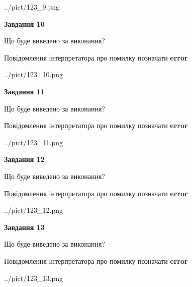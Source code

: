 \documentclass[11pt, ukrainian]{article}
\begin{document}
{\begin {large}
\begin{center}
	{../pict/123_9.png}
\end{center}
\newpage

{\begin {center}\textbf{Завдання 10}\end {center}}\par
Що буде виведено за виконання? \par
Повідомлення інтерпретатора про помилку позначати \textbf{error}

\begin{center}
	{../pict/123_10.png}
\end{center}
\newpage

{\begin {center}\textbf{Завдання 11}\end {center}}\par
Що буде виведено за виконання? \par
Повідомлення інтерпретатора про помилку позначати \textbf{error}

\begin{center}
	{../pict/123_11.png}
\end{center}
\newpage

{\begin {center}\textbf{Завдання 12}\end {center}}\par
Що буде виведено за виконання? \par
Повідомлення інтерпретатора про помилку позначати \textbf{error}

\begin{center}
	{../pict/123_12.png}
\end{center}
\newpage

{\begin {center}\textbf{Завдання 13}\end {center}}\par
Що буде виведено за виконання? \par
Повідомлення інтерпретатора про помилку позначати \textbf{error}

\begin{center}
	{../pict/123_13.png}
\end{center}
\newpage


\end{large}}
\end{document}
